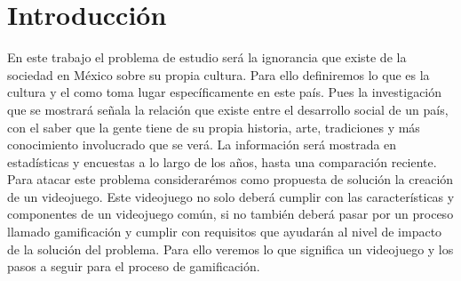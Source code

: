 \chapter{Introducción}


En este trabajo el problema de estudio será la ignorancia que existe de la sociedad en México sobre su propia cultura. Para ello definiremos lo que es la cultura y el como toma lugar específicamente en este país. Pues la investigación que se mostrará señala la relación que existe entre el desarrollo social de un país, con el saber que la gente tiene de su propia historia, arte, tradiciones y más conocimiento involucrado que se verá. La información será mostrada en estadísticas y encuestas a lo largo de los años, hasta una comparación reciente. 
\\[1pt]

Para atacar este problema considerarémos como propuesta de solución la creación de un videojuego. Este videojuego no solo deberá cumplir con las características y componentes de un videojuego común, si no también deberá pasar por un proceso llamado gamificación y cumplir con requisitos que ayudarán al nivel de impacto de la solución del problema. Para ello veremos lo que significa un videojuego y los pasos a seguir para el proceso de gamificación.
\\[1pt]


